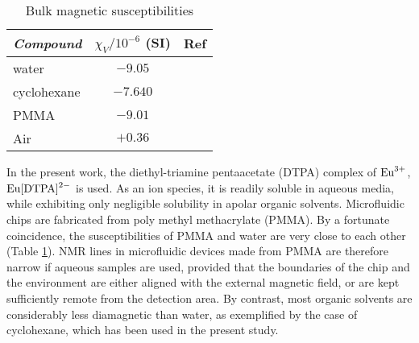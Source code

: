 \begin{table}
\begin{center}
    \caption{Bulk magnetic susceptibilities}
    \label{tab:suscept}
    \begin{tabular}{lcc}\hline\hline
      \emph{Compound} & $\chi_V/10^{-6}$ (SI) & Ref \\ \hline
      water           & $-9.05$               &    \citep{Rumble:2017tp}  \\
      cyclohexane     & $-7.640$              &    \citep{Rumble:2017tp} \\
      PMMA            & $-9.01$               &    \citep{Wapler:2014es}\\
      Air             & $+0.36$               &    \citep{Bakker:2006eea} \\ \hline\hline
    \end{tabular}
\end{center}
\end{table}


In the present work, the diethyl-triamine pentaacetate (DTPA) complex
of $\ce{Eu^{3+}}$, $\ce{Eu[DTPA]^{2-}}$ is used. As an ion species, it is readily soluble
in aqueous media, while exhibiting only negligible solubility in apolar organic
solvents. Microfluidic chips are fabricated from poly methyl methacrylate (PMMA).
By a fortunate coincidence, the susceptibilities of PMMA and
water are very close to
each other (Table \ref{tab:suscept}).  NMR lines
in microfluidic devices made from PMMA are therefore narrow
if  aqueous samples are used, provided that the boundaries of the chip and the environment
are either aligned with the external magnetic field, or are kept sufficiently
remote from the detection area. By contrast, most organic solvents are
considerably less diamagnetic than water, as exemplified by the
case of cyclohexane, which has been used in the present study.

